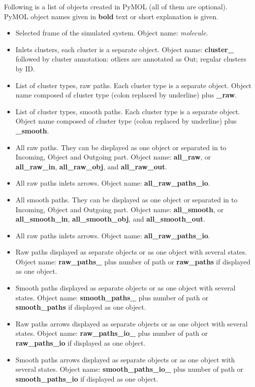 \documentclass[a4paper,10pt,english]{sphinxmanual}
\begin{document}
Following is a list of objects created in PyMOL (all of them are optional). PyMOL object names given in \textbf{bold} text or short explanation is given.
\begin{itemize}
\item {} 
Selected frame of the simulated system. Object name: \emph{molecule}.

\item {} 
Inlets clusters, each cluster is a separate object. Object name: \textbf{cluster\_} followed by cluster annotation: otliers are annotated as Out; regular clusters by ID.

\item {} 
List of cluster types, raw paths. Each cluster type is a separate object. Object name composed of cluster type (colon replaced by underline) plus \textbf{\_raw}.

\item {} 
List of cluster types, smooth paths. Each cluster type is a separate object. Object name composed of cluster type (colon replaced by underline) plus \textbf{\_smooth}.

\item {} 
All raw paths. They can be displayed as one object or separated in to Incoming, Object and Outgoing part. Object name: \textbf{all\_raw}, or \textbf{all\_raw\_in}, \textbf{all\_raw\_obj}, and \textbf{all\_raw\_out}.

\item {} 
All raw paths inlets arrows. Object name: \textbf{all\_raw\_paths\_io}.

\item {} 
All smooth paths. They can be displayed as one object or separated in to Incoming, Object and Outgoing part. Object name: \textbf{all\_smooth}, or \textbf{all\_smooth\_in}, \textbf{all\_smooth\_obj}, and \textbf{all\_smooth\_out}.

\item {} 
All raw paths inlets arrows. Object name: \textbf{all\_raw\_paths\_io}.

\item {} 
Raw paths displayed as separate objects or as one object with several states. Object name: \textbf{raw\_paths\_} plus number of path or \textbf{raw\_paths} if displayed as one object.

\item {} 
Smooth paths displayed as separate objects or as one object with several states. Object name: \textbf{smooth\_paths\_} plus number of path or \textbf{smooth\_paths} if displayed as one object.

\item {} 
Raw paths arrows displayed as separate objects or as one object with several states. Object name: \textbf{raw\_paths\_io\_} plus number of path or \textbf{raw\_paths\_io} if displayed as one object.

\item {} 
Smooth paths arrows displayed as separate objects or as one object with several states. Object name: \textbf{smooth\_paths\_io\_} plus number of path or \textbf{smooth\_paths\_io} if displayed as one object.

\end{itemize}
\end{document}
